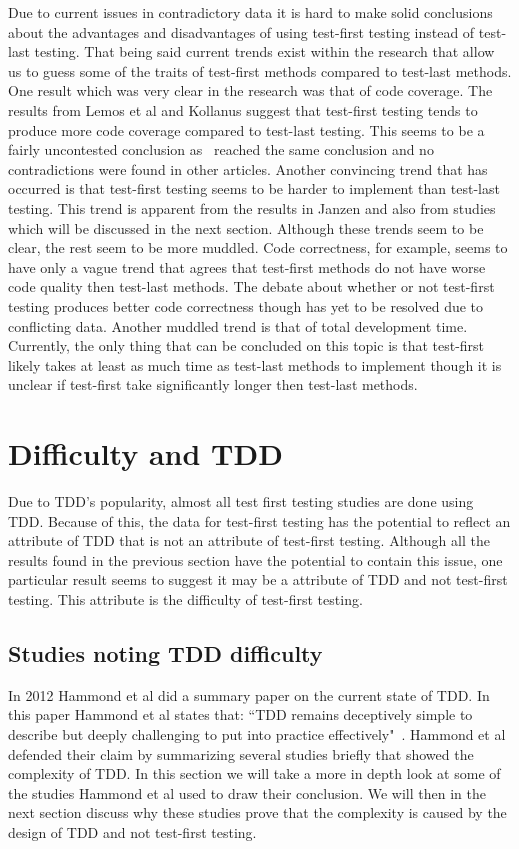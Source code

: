 \documentclass{sig-alternate}
\begin{document}
Due to current issues in contradictory data it is hard to make solid conclusions about the advantages and disadvantages of using test-first testing instead of test-last testing.  That being said current trends exist within the research that allow us to guess some of the traits of test-first methods compared to test-last methods.  One result which was very clear in the research was that of code coverage.  The results from Lemos et al and Kollanus suggest that test-first testing tends to produce more code coverage compared to test-last testing. This seems to be a fairly uncontested conclusion as~\cite{Kettunen:2010, Hammond:2012} reached the same conclusion and no contradictions were found in other articles.  Another convincing trend that has occurred is that test-first testing seems to be harder to implement than test-last testing.  This trend is apparent from the results in Janzen and also from studies~\cite{Aniche:2010, George:2003} which will be discussed in the next section.     Although these trends seem to be clear, the rest seem to be more muddled.  Code correctness, for example, seems to have only a vague trend that agrees that test-first methods do not have worse code quality then test-last methods.  The debate about whether or not test-first testing produces better code correctness though has yet to be resolved due to conflicting data.  Another muddled trend is that of total development time.  Currently, the only thing that can be concluded on this topic is that test-first likely takes at least as much time as test-last methods to implement though it is unclear if test-first take significantly longer then test-last methods.

\section{Difficulty and TDD}
Due to TDD's popularity, almost all test first testing studies are done using TDD.  Because of this, the data for test-first testing has the potential to reflect an attribute of TDD that is not an attribute of test-first testing.  Although all the results found in the previous section have the potential to contain this issue, one particular result seems to suggest it may be a attribute of TDD and not test-first testing.  This attribute is the difficulty of test-first testing.  

\subsection{Studies noting TDD difficulty}
In 2012 Hammond et al did a summary paper on the current state of TDD.  In this paper Hammond et al states that: ``TDD remains deceptively simple to describe but deeply challenging to put into practice effectively"~\cite{Hammond:2012}.  Hammond et al defended their claim by summarizing several studies briefly that showed  the complexity of TDD.  In this section we will take a more in depth look at some of the studies Hammond et al used to draw their conclusion.  We will then in the next section discuss why these studies prove that the complexity is caused by the design of TDD and not test-first testing.
\end{document}
